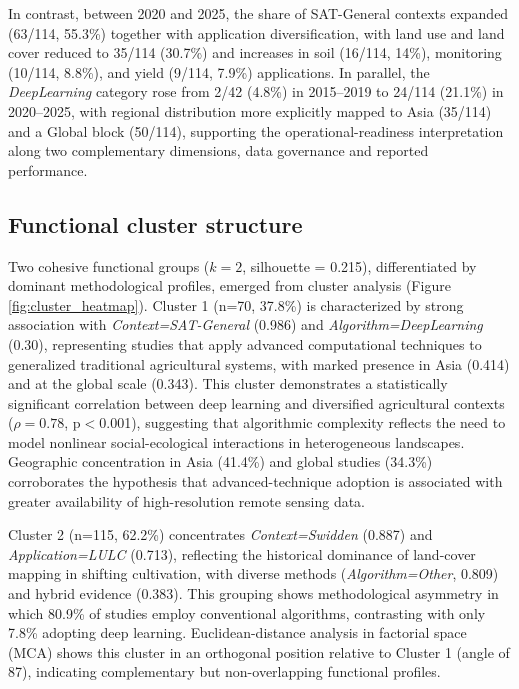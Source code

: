 \documentclass[lineno,pdflatex,sn-apa]{sn-jnl}
\begin{document}
In contrast, between 2020 and 2025, the share of SAT-General contexts expanded (63/114, 55.3\%) together with application diversification, with land use and land cover reduced to 35/114 (30.7\%) and increases in soil (16/114, 14\%), monitoring (10/114, 8.8\%), and yield (9/114, 7.9\%) applications. In parallel, the \textit{DeepLearning} category rose from 2/42 (4.8\%) in 2015--2019 to 24/114 (21.1\%) in 2020--2025, with regional distribution more explicitly mapped to Asia (35/114) and a Global block (50/114), supporting the operational-readiness interpretation along two complementary dimensions, data governance and reported performance.

\subsection{Functional cluster structure}

Two cohesive functional groups ($k = 2$, silhouette = 0.215), differentiated by dominant methodological profiles, emerged from cluster analysis (Figure \ref{fig:cluster_heatmap}). Cluster 1 (n=70, 37.8\%) is characterized by strong association with \textit{Context=SAT-General} (0.986) and \textit{Algorithm=DeepLearning} (0.30), representing studies that apply advanced computational techniques to generalized traditional agricultural systems, with marked presence in Asia (0.414) and at the global scale (0.343). This cluster demonstrates a statistically significant correlation between deep learning and diversified agricultural contexts ($\rho=0.78$, p$<$0.001), suggesting that algorithmic complexity reflects the need to model nonlinear social-ecological interactions in heterogeneous landscapes. Geographic concentration in Asia (41.4\%) and global studies (34.3\%) corroborates the hypothesis that advanced-technique adoption is associated with greater availability of high-resolution remote sensing data.

Cluster 2 (n=115, 62.2\%) concentrates \textit{Context=Swidden} (0.887) and \textit{Application=LULC} (0.713), reflecting the historical dominance of land-cover mapping in shifting cultivation, with diverse methods (\textit{Algorithm=Other}, 0.809) and hybrid evidence (0.383). This grouping shows methodological asymmetry in which 80.9\% of studies employ conventional algorithms, contrasting with only 7.8\% adopting deep learning. Euclidean-distance analysis in factorial space (MCA) shows this cluster in an orthogonal position relative to Cluster 1 (angle of 87\textdegree{}), indicating complementary but non-overlapping functional profiles.
\end{document}
